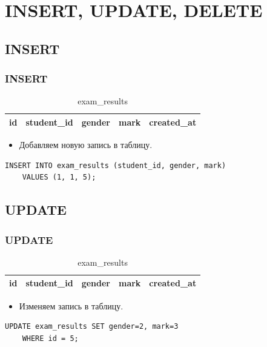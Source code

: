 \documentclass[compress,red]{beamer}
\begin{document}
\section{INSERT, UPDATE, DELETE}
\subsection{INSERT}
\begin{frame}[fragile]
  \frametitle{INSERT}
  \begin{table}
    \begin{tabular}{|c|c|c|c|c|}
      \hline
      id & student\_id & gender & mark & created\_at\\
      \hline
    \end{tabular}
    \caption{exam\_results}
  \end{table}
  \begin{itemize}
    \item Добавляем новую запись в таблицу.
  \end{itemize}
  \scriptsize{
  \begin{lstlisting}[label=sql9,caption=INSERT]
    INSERT INTO exam_results (student_id, gender, mark)
    VALUES (1, 1, 5);
  \end{lstlisting}
  }
\end{frame}

\subsection{UPDATE}
\begin{frame}[fragile]
  \frametitle{UPDATE}
  \begin{table}
    \begin{tabular}{|c|c|c|c|c|}
      \hline
      id & student\_id & gender & mark & created\_at\\
      \hline
    \end{tabular}
    \caption{exam\_results}
  \end{table}
  \begin{itemize}
    \item Изменяем запись в таблицу.
  \end{itemize}
  \scriptsize{
  \begin{lstlisting}[label=sql10,caption=UPDATE]
    UPDATE exam_results SET gender=2, mark=3
    WHERE id = 5;
  \end{lstlisting}
  }
\end{frame}
\end{document}
